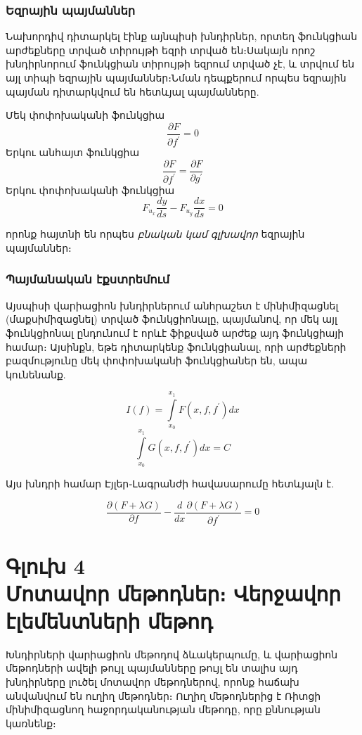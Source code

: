 \documentclass[fleqn, bachelor,subf,12pt,notitlepage]{article}
\begin{document}
\subsubsection*{Եզրային պայմաններ}
Նախորդիվ դիտարկել էինք այնպիսի խնդիրներ, որտեղ ֆունկցիան արժեքները տրված տիրույթի եզրի տրված են։Սակայն որոշ խնդիրնորում ֆունկցիան տիրույթի եզրում տրված չէ, և տրվում են այլ տիպի եզրային պայմաններ։Նման դեպքերում որպես եզրային պայման դիտարկվում են հետևյալ պայմանները.

\noindent Մեկ փոփոխականի ֆունկցիա
$$\dfrac{\partial F}{\partial f^{'}}=0$$
Երկու անհայտ ֆունկցիա
$$\dfrac{\partial F}{\partial f^{'}}=\dfrac{\partial F}{\partial g^{'}}$$
Երկու փոփոխականի ֆունկցիա
$$F_{u_{x}}\dfrac{dy}{ds}-F_{u_{y}}\dfrac{dx}{ds}=0$$

\noindent որոնք հայտնի են որպես \emph{բնական կամ գլխավոր}  եզրային պայմաններ։

\subsubsection*{Պայմանական էքստրեմում}
Այսպիսի վարիացիոն խնդիրներում անհրաշետ է մինիմիզացնել (մաքսիմիզացնել) տրված ֆունկցիոնալը, պայմանով, որ մեկ այլ ֆունկցիոնալ ընդունում է որևէ ֆիքսված արժեք այդ ֆունկցիայի համար։ Այսինքն, եթե դիտարկենք ֆունկցիանալ, որի արժեքների բազմությունը մեկ փոփոխականի ֆունկցիաներ են, ապա կունենանք.

$$I\left(f\right)=\int \limits_{x_{0}}^{x_{1}} F\left(x, f, f^{'}\right)dx $$
$$\int \limits_{x_{0}}^{x_{1}} G\left(x, f, f^{'}\right)dx = C$$

Այս խնդրի համար Էյլեր֊Լագրանժի հավասարումը հետևյալն է.

$$\dfrac{\partial \left(F+\lambda G\right)}{\partial f} - \dfrac{d}{dx} \dfrac{\partial \left(F+\lambda G\right)}{\partial f^{'}} = 0$$


\newpage


\section*{\centering Գլուխ 4 \\ Մոտավոր մեթոդներ։ Վերջավոր էլեմենտների մեթոդ}
\setcounter{equation}{0}
Խնդիրների վարիացիոն մեթոդով ձևակերպումը, և վարիացիոն մեթոդների ավելի թույլ պայմանները թույլ են տալիս այդ խնդիրները լուծել մոտավոր մեթոդներով, որոնք հաճախ անվանվում են ուղիղ մեթոդներ։ Ուղիղ մեթոդներից է Ռիտցի մինիմիզացնող հաջորդականության մեթոդը, որը քննության կառնենք։ 
\end{document}
